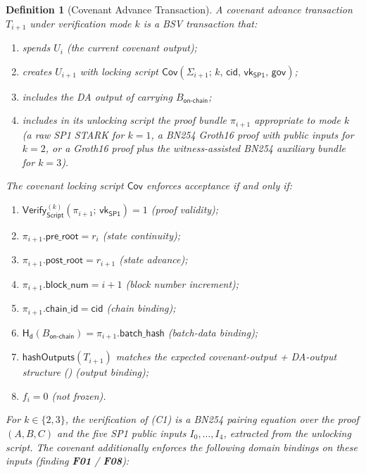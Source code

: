 \documentclass[11pt,a4paper]{article}
\newtheorem{definition}{Definition}[section]
\newcommand{\Hashd}{\mathsf{H_d}}        %
\newcommand{\Verify}{\mathsf{Verify}}
\newcommand{\Cov}{\mathsf{Cov}}
\newcommand{\SPone}{\mathsf{SP1}}
\newcommand{\vkSP}{\mathsf{vk}_{\SPone}}           %
\begin{document}
\begin{definition}[Covenant Advance Transaction]\label{def:cov-advance}
A covenant advance transaction $T_{i+1}$ under verification mode $k$ is a BSV transaction that:
\begin{enumerate}[nosep,label=(\alph*)]
    \item spends $U_i$ (the current covenant output);
    \item creates $U_{i+1}$ with locking script $\Cov(\Sigma_{i+1};\,k,\,\mathsf{cid},\,\vkSP,\,\mathsf{gov})$;
    \item includes the DA output of  carrying $B_{\mathsf{on\text{-}chain}}$;
    \item includes in its unlocking script the proof bundle $\pi_{i+1}$ appropriate to mode $k$ (a raw SP1 STARK for $k = 1$, a BN254 Groth16 proof with public inputs for $k = 2$, or a Groth16 proof plus the witness-assisted BN254 auxiliary bundle for $k = 3$).
\end{enumerate}
The covenant locking script $\Cov$ enforces acceptance if and only if:
\begin{enumerate}[nosep,label=(C\arabic*)]
    \item $\Verify_{\mathsf{Script}}^{(k)}(\pi_{i+1};\,\vkSP) = 1$ \hfill (proof validity);
    \item $\pi_{i+1}.\mathsf{pre\_root} = r_i$ \hfill (state continuity);
    \item $\pi_{i+1}.\mathsf{post\_root} = r_{i+1}$ \hfill (state advance);
    \item $\pi_{i+1}.\mathsf{block\_num} = i + 1$ \hfill (block number increment);
    \item $\pi_{i+1}.\mathsf{chain\_id} = \mathsf{cid}$ \hfill (chain binding);
    \item $\Hashd(B_{\mathsf{on\text{-}chain}}) = \pi_{i+1}.\mathsf{batch\_hash}$ \hfill (batch-data binding);
    \item $\mathsf{hashOutputs}(T_{i+1})$ matches the expected covenant-output + DA-output structure () \hfill (output binding);
    \item $f_i = 0$ \hfill (not frozen).
\end{enumerate}
For $k \in \{2, 3\}$, the verification of (C1) is a BN254 pairing equation over the proof $(A, B, C)$ and the five SP1 public inputs $I_0, \ldots, I_4$, extracted from the unlocking script. The covenant additionally enforces the following domain bindings on these inputs (finding \textbf{F01} / \textbf{F08}):
\begin{enumerate}[nosep,label=(C\arabic*),start=9]

\end{enumerate}
\end{definition}
\end{document}

